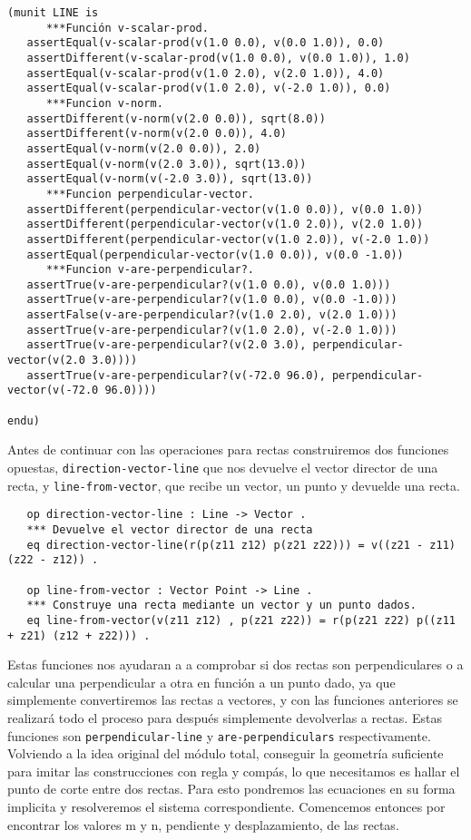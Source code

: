 {\codesize
\begin{verbatim}
(munit LINE is
      ***Función v-scalar-prod.
   assertEqual(v-scalar-prod(v(1.0 0.0), v(0.0 1.0)), 0.0)
   assertDifferent(v-scalar-prod(v(1.0 0.0), v(0.0 1.0)), 1.0)
   assertEqual(v-scalar-prod(v(1.0 2.0), v(2.0 1.0)), 4.0)
   assertEqual(v-scalar-prod(v(1.0 2.0), v(-2.0 1.0)), 0.0)		
      ***Funcion v-norm.
   assertDifferent(v-norm(v(2.0 0.0)), sqrt(8.0))
   assertDifferent(v-norm(v(2.0 0.0)), 4.0)
   assertEqual(v-norm(v(2.0 0.0)), 2.0)
   assertEqual(v-norm(v(2.0 3.0)), sqrt(13.0))
   assertEqual(v-norm(v(-2.0 3.0)), sqrt(13.0))
      ***Funcion perpendicular-vector.
   assertDifferent(perpendicular-vector(v(1.0 0.0)), v(0.0 1.0))
   assertDifferent(perpendicular-vector(v(1.0 2.0)), v(2.0 1.0))
   assertDifferent(perpendicular-vector(v(1.0 2.0)), v(-2.0 1.0))
   assertEqual(perpendicular-vector(v(1.0 0.0)), v(0.0 -1.0))
      ***Funcion v-are-perpendicular?.
   assertTrue(v-are-perpendicular?(v(1.0 0.0), v(0.0 1.0)))
   assertTrue(v-are-perpendicular?(v(1.0 0.0), v(0.0 -1.0)))
   assertFalse(v-are-perpendicular?(v(1.0 2.0), v(2.0 1.0)))
   assertTrue(v-are-perpendicular?(v(1.0 2.0), v(-2.0 1.0)))
   assertTrue(v-are-perpendicular?(v(2.0 3.0), perpendicular-vector(v(2.0 3.0))))
   assertTrue(v-are-perpendicular?(v(-72.0 96.0), perpendicular-vector(v(-72.0 96.0))))

endu)
\end{verbatim}
}

Antes de continuar con las operaciones para rectas construiremos dos funciones opuestas, \texttt{direction-vector-line} que nos devuelve el vector director de una recta, y \texttt{line-from-vector}, que recibe un vector, un punto y devuelde una recta. \par
{\codesize
\begin{verbatim}
   op direction-vector-line : Line -> Vector .
   *** Devuelve el vector director de una recta
   eq direction-vector-line(r(p(z11 z12) p(z21 z22))) = v((z21 - z11) (z22 - z12)) .

   op line-from-vector : Vector Point -> Line .
   *** Construye una recta mediante un vector y un punto dados.
   eq line-from-vector(v(z11 z12) , p(z21 z22)) = r(p(z21 z22) p((z11 + z21) (z12 + z22))) .
\end{verbatim}
}

Estas funciones nos ayudaran a a comprobar si dos rectas son perpendiculares o a calcular una perpendicular a otra en función a un punto dado, ya que simplemente convertiremos las rectas a vectores, y con las funciones anteriores se realizará todo el proceso para después simplemente devolverlas a rectas. Estas funciones son \texttt{perpendicular-line} y \texttt{are-perpendiculars} respectivamente. Volviendo a la idea original del módulo total, conseguir la geometría suficiente para imitar las construcciones con regla y compás, lo que necesitamos es hallar el punto de corte entre dos rectas. Para esto pondremos las ecuaciones en su forma implicita y resolveremos el sistema correspondiente. Comencemos entonces por encontrar los valores m y n, pendiente y desplazamiento, de las rectas. \par

